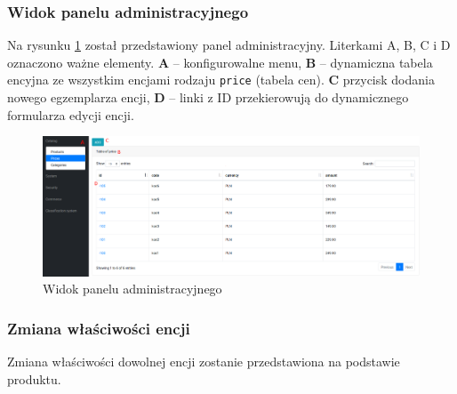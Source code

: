 \subsubsection{Widok panelu administracyjnego}
Na rysunku \ref{scr_adminmain} został przedstawiony panel administracyjny. Literkami A, B, C i D oznaczono ważne elementy. \textbf{A} -- konfigurowalne menu, \textbf{B} -- dynamiczna tabela encyjna ze wszystkim encjami rodzaju \texttt{price} (tabela cen). \textbf{C} przycisk dodania nowego egzemplarza encji, \textbf{D} -- linki z ID przekierowują do dynamicznego formularza edycji encji. 
\begin{figure}
	\begin{center}
		\includegraphics[width=1\textwidth]{admin-main.png}
	\end{center}
	\caption{{\color{black}Widok panelu administracyjnego}} \label{scr_adminmain}
\end{figure}

\subsubsection{Zmiana właściwości encji} 
Zmiana właściwości dowolnej encji zostanie przedstawiona na podstawie produktu.
 
